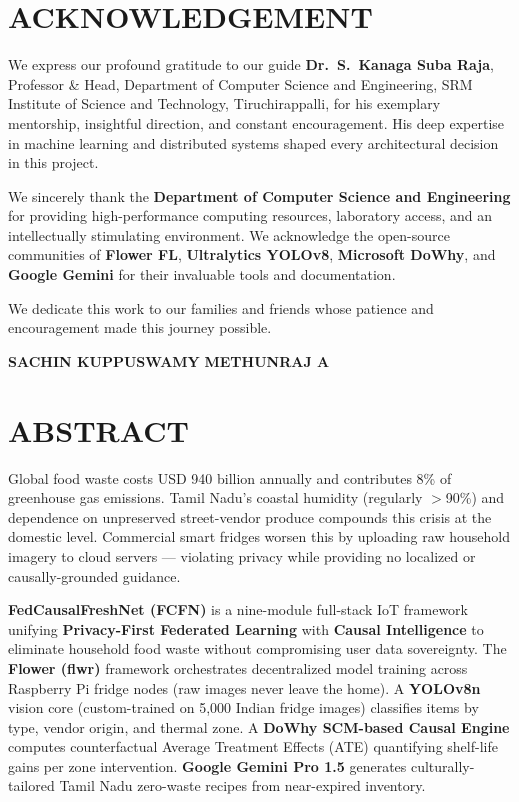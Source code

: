 \documentclass[12pt,a4paper]{report}
\begin{document}
\chapter*{ACKNOWLEDGEMENT}
We express our profound gratitude to our guide \textbf{Dr.\ S.\ Kanaga Suba Raja}, Professor \& Head, Department of Computer Science and Engineering, SRM Institute of Science and Technology, Tiruchirappalli, for his exemplary mentorship, insightful direction, and constant encouragement. His deep expertise in machine learning and distributed systems shaped every architectural decision in this project.

We sincerely thank the \textbf{Department of Computer Science and Engineering} for providing high-performance computing resources, laboratory access, and an intellectually stimulating environment. We acknowledge the open-source communities of \textbf{Flower FL}, \textbf{Ultralytics YOLOv8}, \textbf{Microsoft DoWhy}, and \textbf{Google Gemini} for their invaluable tools and documentation.

We dedicate this work to our families and friends whose patience and encouragement made this journey possible.

\vspace{0.8cm}
\noindent\textbf{SACHIN KUPPUSWAMY} \hspace{2cm} \textbf{METHUNRAJ A}

\chapter*{ABSTRACT}
Global food waste costs USD 940 billion annually and contributes 8\% of greenhouse gas emissions. Tamil Nadu's coastal humidity (regularly $>$90\%) and dependence on unpreserved street-vendor produce compounds this crisis at the domestic level. Commercial smart fridges worsen this by uploading raw household imagery to cloud servers — violating privacy while providing no localized or causally-grounded guidance.

\textbf{FedCausalFreshNet (FCFN)} is a nine-module full-stack IoT framework unifying \textbf{Privacy-First Federated Learning} with \textbf{Causal Intelligence} to eliminate household food waste without compromising user data sovereignty. The \textbf{Flower (flwr)} framework orchestrates decentralized model training across Raspberry Pi fridge nodes (raw images never leave the home). A \textbf{YOLOv8n} vision core (custom-trained on 5,000 Indian fridge images) classifies items by type, vendor origin, and thermal zone. A \textbf{DoWhy SCM-based Causal Engine} computes counterfactual Average Treatment Effects (ATE) quantifying shelf-life gains per zone intervention. \textbf{Google Gemini Pro 1.5} generates culturally-tailored Tamil Nadu zero-waste recipes from near-expired inventory.
\end{document}
